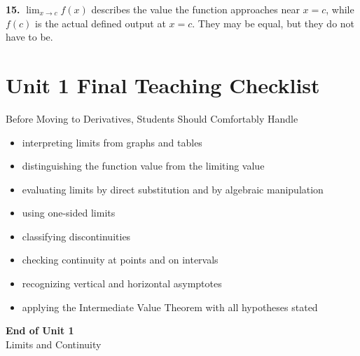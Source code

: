\documentclass[11pt]{article}
\begin{document}
\bigskip

\textbf{15.}
$\lim_{x\to c}f(x)$ describes the value the function approaches near $x=c$, while $f(c)$ is the actual defined output at $x=c$. They may be equal, but they do not have to be.

%
%
%
\newpage
\section*{Unit 1 Final Teaching Checklist}

\begin{skillbox}{Before Moving to Derivatives, Students Should Comfortably Handle}
\begin{itemize}
    \item interpreting limits from graphs and tables
    \item distinguishing the function value from the limiting value
    \item evaluating limits by direct substitution and by algebraic manipulation
    \item using one-sided limits
    \item classifying discontinuities
    \item checking continuity at points and on intervals
    \item recognizing vertical and horizontal asymptotes
    \item applying the Intermediate Value Theorem with all hypotheses stated
\end{itemize}
\end{skillbox}

\vfill

\begin{center}
{\Large\bfseries\color{novelPurpleDark} End of Unit 1}\\[0.5em]
{\large\color{novelPurple} Limits and Continuity}
\end{center}
\end{document}
